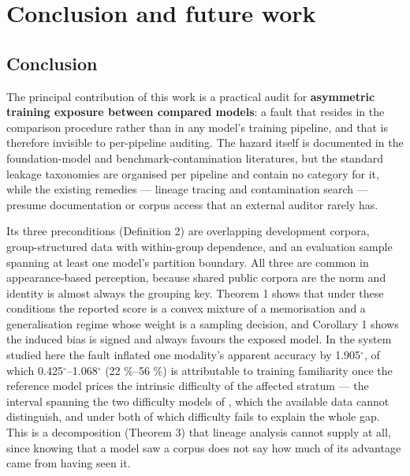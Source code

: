 \FloatBarrier

\section{Conclusion and future work}

\FloatBarrier

\subsection{Conclusion}

The principal contribution of this work is a practical audit for \textbf{asymmetric training exposure between compared models}: a fault that resides in the comparison procedure rather than in any model's training pipeline, and that is therefore invisible to per-pipeline auditing. The hazard itself is documented in the foundation-model and benchmark-contamination literatures, but the standard leakage taxonomies are organised per pipeline and contain no category for it, while the existing remedies --- lineage tracing and contamination search --- presume documentation or corpus access that an external auditor rarely has.

Its three preconditions (Definition 2) are overlapping development corpora, group-structured data with within-group dependence, and an evaluation sample spanning at least one model's partition boundary. All three are common in appearance-based perception, because shared public corpora are the norm and identity is almost always the grouping key. Theorem 1 shows that under these conditions the reported score is a convex mixture of a memorisation and a generalisation regime whose weight is a sampling decision, and Corollary 1 shows the induced bias is signed and always favours the exposed model. In the system studied here the fault inflated one modality's apparent accuracy by 1.905$^{\circ}$, of which 0.425$^{\circ}$--1.068$^{\circ}$ (22 \%--56 \%) is attributable to training familiarity once the reference model prices the intrinsic difficulty of the affected stratum --- the interval spanning the two difficulty models of , which the available data cannot distinguish, and under both of which difficulty fails to explain the whole gap. This is a decomposition (Theorem 3) that lineage analysis cannot supply at all, since knowing that a model saw a corpus does not say how much of its advantage came from having seen it.

